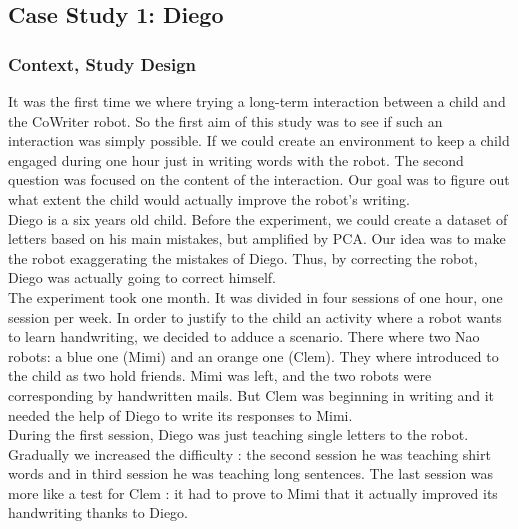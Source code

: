 \documentclass{article}
\begin{document}
\subsection{Case Study 1: Diego}

\subsubsection{Context, Study Design}
It was the first time we where trying a long-term interaction between a child
and the CoWriter robot. So the first aim of this study was to see if such an
interaction was simply possible. If we could create an environment to keep a child engaged
during one hour just in writing words with the robot.
The second question was focused on the content of the interaction. Our goal was
to figure out what extent the child would actually improve the robot's
writing.\\

Diego is a six years old child. 
Before the experiment, we could create a dataset of letters based on his main
mistakes, but amplified by PCA. Our idea was to make the robot
exaggerating the mistakes of Diego. Thus, by correcting the robot, 
Diego was actually going to correct himself.\\

The experiment took one month. It was divided in four sessions of one hour, one session per week.
In order to justify to the child an activity where a robot wants to learn
handwriting, we decided to adduce a scenario. There where two Nao robots: a
blue one (Mimi) and an orange one (Clem). They where introduced to the child as
two hold friends. Mimi was left, and the two robots were corresponding by
handwritten mails. But Clem was beginning in writing and it needed the help of
Diego to write its responses to Mimi.\\

During the first session, Diego was just teaching single letters to the robot.
Gradually we increased the difficulty : the second session he was teaching
shirt words and in third session he was teaching long sentences. The last session was more like a test for Clem
: it had to prove to Mimi that it actually improved its handwriting thanks to
Diego. 
\end{document}
